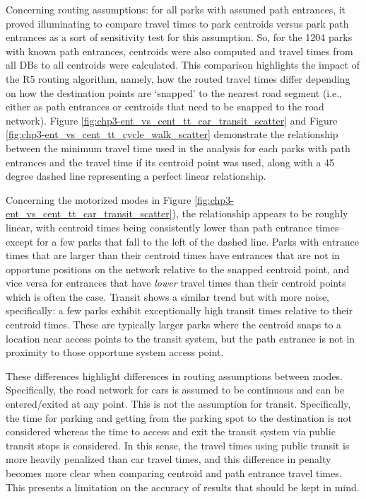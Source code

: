\documentclass[
11pt, %
oneside, %
english, %
singlespacing, %
]{macthesis} %
\begin{document}
Concerning routing assumptions: for all parks with assumed path entrances, it proved illuminating to compare travel times to park centroids versus park path entrances as a sort of sensitivity test for this assumption. So, for the 1204 parks with known path entrances, centroids were also computed and travel times from all DBs to all centroids were calculated. This comparison highlights the impact of the R5 routing algorithm, namely, how the routed travel times differ depending on how the destination points are `snapped' to the nearest road segment (i.e., either as path entrances or centroids that need to be snapped to the road network). Figure \ref{fig:chp3-ent_vs_cent_tt_car_transit_scatter} and Figure \ref{fig:chp3-ent_vs_cent_tt_cycle_walk_scatter} demonstrate the relationship between the minimum travel time used in the analysis for each parks with path entrances and the travel time if its centroid point was used, along with a 45 degree dashed line representing a perfect linear relationship.

Concerning the motorized modes in Figure \ref{fig:chp3-ent_vs_cent_tt_car_transit_scatter}), the relationship appears to be roughly linear, with centroid times being consistently lower than path entrance times--except for a few parks that fall to the left of the dashed line. Parks with entrance times that are larger than their centroid times have entrances that are not in opportune positions on the network relative to the snapped centroid point, and vice versa for entrances that have \emph{lower} travel times than their centroid points which is often the case. Transit shows a similar trend but with more noise, specifically: a few parks exhibit exceptionally high transit times relative to their centroid times. These are typically larger parks where the centroid snaps to a location near access points to the transit system, but the path entrance is not in proximity to those opportune system access point.

These differences highlight differences in routing assumptions between modes. Specifically, the road network for cars is assumed to be continuous and can be entered/exited at any point. This is not the assumption for transit. Specifically, the time for parking and getting from the parking spot to the destination is not considered whereas the time to access and exit the transit system via public transit stops is considered. In this sense, the travel times using public transit is more heavily penalized than car travel times, and this difference in penalty becomes more clear when comparing centroid and path entrance travel times. This presents a limitation on the accuracy of results that should be kept in mind.
\end{document}

